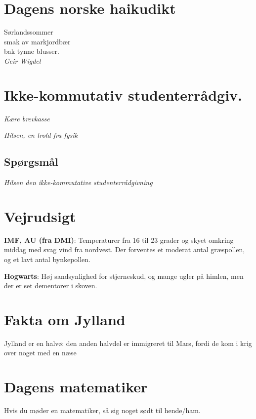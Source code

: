

\begin{minipage}[b]{0.95\linewidth}
\begin{minipage}[t]{0.47\textwidth}
\vspace{1mm}
\section*{Dagens norske haikudikt}
\begin{center}
Sørlandssommer \\
smak av markjordbær \\
bak tynne blusser. \\
\emph{Geir Wigdel}
\end{center}
 

\section*{Ikke-kommutativ studenterrådgiv.}
\emph{Kære brevkasse}


\emph{Hilsen, en trold fra fysik}

\subsection*{Spørgsmål}


{\flushright\emph{Hilsen den ikke-kommutative studenterrådgivning}}

\end{minipage}%
\hfill\begin{minipage}[t]{0.47\textwidth}
\vspace{2mm}
\section*{Vejrudsigt}
\textbf{IMF, AU (fra DMI)}: Temperaturer fra 16 til 23 grader og skyet omkring middag med svag vind fra nordvest. Der forventes et moderat antal græspollen, og et lavt antal bynkepollen.

\textbf{Hogwarts}: Høj sandsynlighed for stjerneskud, og mange ugler på himlen, men der er set dementorer i skoven.

\section*{Fakta om Jylland}
Jylland er en halvø: den anden halvdel er immigreret til Mars, fordi de kom i krig over noget med en næse

\section*{Dagens matematiker}
Hvis du møder en matematiker, så sig noget sødt til hende/ham.


\end{minipage}
\end{minipage}
